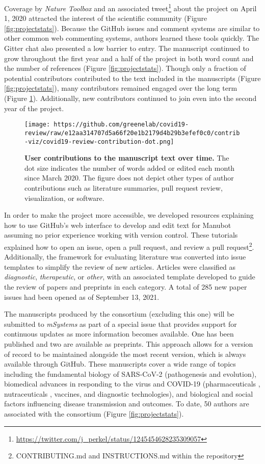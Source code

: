 \documentclass[twocolumn]{ceurart}
\begin{document}
Coverage by \emph{Nature Toolbox} \citep{AE0QcVgJ} and an associated tweet\footnote{\url{https://twitter.com/j_perkel/status/1245454628235309057}} about the project on April 1, 2020 attracted the interest of the scientific community (Figure \ref{fig:projectstats}).
Because the GitHub issues and comment systems are similar to other common web commenting systems, authors learned these tools quickly.
The Gitter chat also presented a low barrier to entry.
The manuscript continued to grow throughout the first year and a half of the project in both word count and the number of references (Figure \ref{fig:projectstats}).
Though only a fraction of potential contributors contributed to the text included in the manuscripts (Figure \ref{fig:projectstats}), many contributors remained engaged over the long term (Figure \ref{fig:projectdots}).
Additionally, new contributors continued to join even into the second year of the project.

\begin{figure}
\hypertarget{fig:projectdots}{%
\centering
\texttt{[image: https://github.com/greenelab/covid19-review/raw/e12aa314707d5a66f20e1b2179d4b29b3efef0c0/contrib-viz/covid19-review-contribution-dot.png]}
\caption{\textbf{User contributions to the manuscript text over time.}
The dot size indicates the number of words added or edited each month since March 2020.
The figure does not depict other types of author contributions such as literature summaries, pull request review, visualization, or software.}\label{fig:projectdots}
}
\end{figure}

In order to make the project more accessible, we developed resources explaining how to use GitHub's web interface to develop and edit text for Manubot assuming no prior experience working with version control.
These tutorials explained how to open an issue, open a pull request, and review a pull request\footnote{CONTRIBUTING.md and INSTRUCTIONS.md within the
  repository}.
Additionally, the framework for evaluating literature was converted into issue templates to simplify the review of new articles.
Articles were classified as \emph{diagnostic}, \emph{therapeutic}, or \emph{other}, with an associated template developed to guide the review of papers and preprints in each category.
A total of 285 new paper issues had been opened as of September 13, 2021.

The manuscripts produced by the consortium (excluding this one) will be submitted to \emph{mSystems} as part of a special issue that provides support for continuous updates as more information becomes available.
One has been published and two are available as preprints.
This approach allows for a version of record to be maintained alongside the most recent version, which is always available through GitHub.
These manuscripts cover a wide range of topics including the fundamental biology of SARS-CoV-2 (pathogenesis \citep{r366f5T3} and evolution), biomedical advances in responding to the virus and COVID-19 (pharmaceuticals \citep{cifK9B8t}, nutraceuticals \citep{wgAGKcBj}, vaccines, and diagnostic technologies), and biological and social factors influencing disease transmission and outcomes.
To date, 50 authors are associated with the consortium (Figure \ref{fig:projectstats}).
\end{document}
